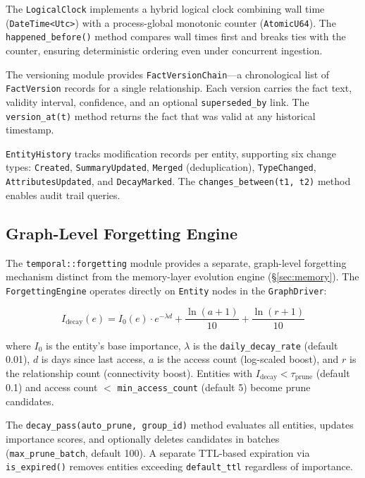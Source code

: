 \documentclass[11pt,a4paper,twocolumn]{article}
\begin{document}
The \texttt{LogicalClock} implements a hybrid logical clock combining
wall time (\texttt{DateTime<Utc>}) with a process-global monotonic
counter (\texttt{AtomicU64}). The \texttt{happened\_before()} method
compares wall times first and breaks ties with the counter, ensuring
deterministic ordering even under concurrent ingestion.

The versioning module provides \texttt{FactVersionChain}---a
chronological list of \texttt{FactVersion} records for a single
relationship. Each version carries the fact text, validity interval,
confidence, and an optional \texttt{superseded\_by} link. The
\texttt{version\_at(t)} method returns the fact that was valid at
any historical timestamp.

\texttt{EntityHistory} tracks modification records per entity,
supporting six change types: \texttt{Created}, \texttt{SummaryUpdated},
\texttt{Merged} (deduplication), \texttt{TypeChanged},
\texttt{AttributesUpdated}, and \texttt{DecayMarked}. The
\texttt{changes\_between(t1, t2)} method enables audit trail queries.

\subsection{Graph-Level Forgetting Engine}

The \texttt{temporal::forgetting} module provides a separate,
graph-level forgetting mechanism distinct from the memory-layer
evolution engine (\S\ref{sec:memory}). The \texttt{ForgettingEngine}
operates directly on \texttt{Entity} nodes in the \texttt{GraphDriver}:

\begin{equation}
I_\text{decay}(e) = I_0(e) \cdot e^{-\lambda d}
  + \frac{\ln(a+1)}{10}
  + \frac{\ln(r+1)}{10}
\end{equation}

where $I_0$ is the entity's base importance, $\lambda$ is the
\texttt{daily\_decay\_rate} (default 0.01), $d$ is days since last
access, $a$ is the access count (log-scaled boost), and $r$ is
the relationship count (connectivity boost). Entities with
$I_\text{decay} < \tau_\text{prune}$ (default 0.1) and access
count $<$ \texttt{min\_access\_count} (default 5) become prune
candidates.

The \texttt{decay\_pass(auto\_prune, group\_id)} method evaluates
all entities, updates importance scores, and optionally deletes
candidates in batches (\texttt{max\_prune\_batch}, default 100).
A separate TTL-based expiration via \texttt{is\_expired()} removes
entities exceeding \texttt{default\_ttl} regardless of importance.
\end{document}
